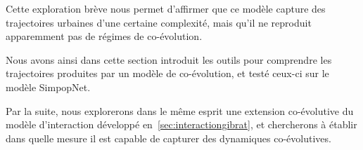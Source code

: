 Cette exploration brève nous permet d'affirmer que ce modèle capture des trajectoires urbaines d'une certaine complexité, mais qu'il ne reproduit apparemment pas de régimes de co-évolution.




\stars

Nous avons ainsi dans cette section introduit les outils pour comprendre les trajectoires produites par un modèle de co-évolution, et testé ceux-ci sur le modèle SimpopNet.

Par la suite, nous explorerons dans le même esprit une extension co-évolutive du modèle d'interaction développé en~\ref{sec:interactiongibrat}, et chercherons à établir dans quelle mesure il est capable de capturer des dynamiques co-évolutives.



\stars








